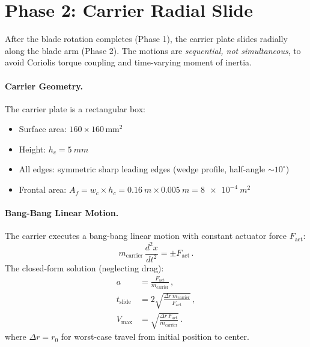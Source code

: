 \documentclass[11pt,a4paper]{article}
\begin{document}
\section{Phase 2: Carrier Radial Slide}
\label{sec:carrier}

After the blade rotation completes (Phase 1), the carrier plate slides
radially along the blade arm (Phase 2). The motions are \emph{sequential,
not simultaneous}, to avoid Coriolis torque coupling and time-varying
moment of inertia.

\paragraph{Carrier Geometry.}
The carrier plate is a rectangular box:
\begin{itemize}[nosep]
  \item Surface area: $160 \times 160\,\mathrm{mm}^2$
  \item Height: $h_c = \SI{5}{mm}$
  \item All edges: symmetric sharp leading edges (wedge profile, half-angle $\sim 10^\circ$)
  \item Frontal area: $A_f = w_c \times h_c = \SI{0.16}{m} \times \SI{0.005}{m} = \SI{8e-4}{m^2}$
\end{itemize}

\paragraph{Bang-Bang Linear Motion.}
The carrier executes a bang-bang linear motion with constant actuator
force $F_\mathrm{act}$:
\begin{equation}
  m_\mathrm{carrier}\,\frac{d^2 x}{dt^2} = \pm F_\mathrm{act}\,.
\end{equation}
The closed-form solution (neglecting drag):
\begin{align}
  a &= \frac{F_\mathrm{act}}{m_\mathrm{carrier}}\,,
    \label{eq:a_carrier} \\
  t_\mathrm{slide} &= 2\sqrt{\frac{\Delta r\, m_\mathrm{carrier}}{F_\mathrm{act}}}\,,
    \label{eq:tslide} \\
  V_\mathrm{max} &= \sqrt{\frac{\Delta r\, F_\mathrm{act}}{m_\mathrm{carrier}}}\,.
    \label{eq:Vmax_carrier}
\end{align}
where $\Delta r = r_0$ for worst-case travel from initial position to center.
\end{document}

